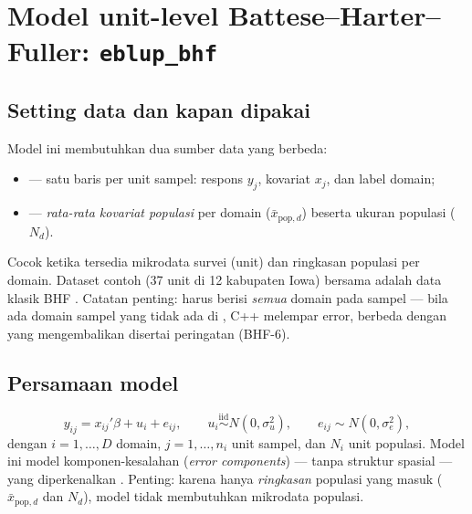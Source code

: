 \section{Model unit-level Battese--Harter--Fuller: \texttt{eblup\_bhf}}\label{sec:bhf}

\subsection{Setting data dan kapan dipakai}\label{sec:bhf-setting}

Model ini membutuhkan dua sumber data yang berbeda:
\begin{itemize}
  \item {} --- satu baris per unit sampel: respons $y_j$,
        kovariat $x_j$, dan label domain;
  \item {} --- \emph{rata-rata kovariat populasi} per domain
        ($\bar x_{\text{pop},d}$) beserta ukuran populasi 
        ($N_d$).
\end{itemize}
Cocok ketika tersedia mikrodata survei (unit) dan ringkasan populasi per
domain. Dataset contoh  (37 unit di 12 kabupaten Iowa)
bersama  adalah data klasik BHF
\citep{battese1988error}. Catatan penting:  harus berisi
\emph{semua} domain pada sampel --- bila ada domain sampel yang tidak ada di
, C++ melempar error, berbeda dengan  yang
mengembalikan  disertai peringatan (BHF-6).

\subsection{Persamaan model}\label{sec:bhf-model}

\begin{equation}
  y_{ij}=x_{ij}'\beta+u_i+e_{ij},\qquad
  u_i\overset{\text{iid}}{\sim}N(0,\sigma_u^2),\qquad
  e_{ij}\sim N(0,\sigma_e^2),
  \label{eq:bhf-model}
\end{equation}
dengan $i=1,\dots,D$ domain, $j=1,\dots,n_i$ unit sampel, dan
$N_i$ unit populasi. Model ini model komponen-kesalahan (\emph{error
components}) --- tanpa struktur spasial --- yang diperkenalkan
\citet{battese1988error}. Penting: karena hanya \emph{ringkasan} populasi
yang masuk ($\bar x_{\text{pop},d}$ dan $N_d$), model tidak membutuhkan
mikrodata populasi.

